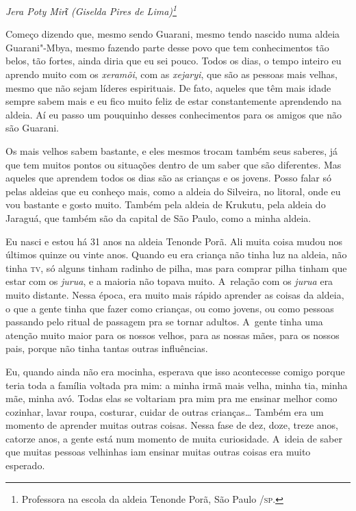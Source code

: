 
\begin{flushright}
\emph{Jera Poty Mirῖ (Giselda Pires de Lima)\footnote{Professora na escola da aldeia Tenonde Porã, São Paulo /\textsc{sp}.}}
\end{flushright}  

\noindent
Começo dizendo que, mesmo sendo Guarani, mesmo tendo nascido numa aldeia
Guarani"-Mbya, mesmo fazendo parte desse povo que tem conhecimentos tão
belos, tão fortes, ainda diria que eu sei pouco. Todos os dias, o tempo
inteiro eu aprendo muito com os \emph{xeramõi}, com as \emph{xejaryi}, que são as
pessoas mais velhas, mesmo que não sejam líderes espirituais. De fato,
aqueles que têm mais idade sempre sabem mais e eu fico muito feliz de
estar constantemente aprendendo na aldeia. Aí eu passo um pouquinho
desses conhecimentos para os amigos que não são Guarani.

Os mais velhos sabem bastante, e eles mesmos trocam também seus saberes,
já que tem muitos pontos ou situações dentro de um saber que são
diferentes. Mas aqueles que aprendem todos os dias são as crianças e os
jovens. Posso falar só pelas aldeias que eu conheço mais, como a aldeia
do Silveira, no litoral, onde eu vou bastante e gosto muito. Também
pela aldeia de Krukutu, pela aldeia do Jaraguá, que também são da
capital de São Paulo, como a minha aldeia.

Eu nasci e estou há 31 anos na aldeia Tenonde Porã. Ali muita coisa
mudou nos últimos quinze ou vinte anos. Quando eu era criança não tinha
luz na aldeia, não tinha \textsc{tv}, só alguns tinham radinho de pilha, mas
para comprar pilha tinham que estar com os \emph{jurua}, e a maioria não
topava muito. A~relação com os \emph{jurua} era muito distante. Nessa época,
era muito mais rápido aprender as coisas da aldeia, o que a gente tinha
que fazer como crianças, ou como jovens, ou como pessoas passando pelo
ritual de passagem pra se tornar adultos. A~gente tinha uma atenção
muito maior para os nossos velhos, para as nossas mães, para os nossos
pais, porque não tinha tantas outras influências.

Eu, quando ainda não era mocinha, esperava que isso acontecesse comigo
porque teria toda a família voltada pra mim: a minha irmã mais velha,
minha tia, minha mãe, minha avó. Todas elas se voltariam pra mim pra me
ensinar melhor como cozinhar, lavar roupa, costurar, cuidar de outras
crianças\ldots{} Também era um momento de aprender muitas outras coisas.
Nessa fase de dez, doze, treze anos, catorze anos, a gente está num
momento de muita curiosidade. A~ideia de saber que muitas pessoas
velhinhas iam ensinar muitas outras coisas era muito esperado.

